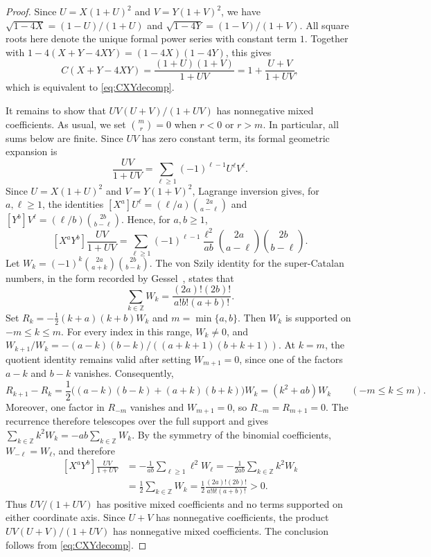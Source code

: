 \documentclass[11pt]{article}
\theoremstyle{plain}
\theoremstyle{remark}
\begin{document}
\begin{proof}
Since $U=X(1+U)^2$ and $V=Y(1+V)^2$, we have
$\sqrt{1-4X}=(1-U)/(1+U)$ and
$\sqrt{1-4Y}=(1-V)/(1+V)$.  All square roots here denote the unique
formal power series with constant term $1$.  Together with
$1-4(X+Y-4XY)=(1-4X)(1-4Y)$, this gives
\[
C(X+Y-4XY)=\frac{(1+U)(1+V)}{1+UV}
=1+\frac{U+V}{1+UV},
\]
which is equivalent to \eqref{eq:CXYdecomp}.

It remains to show that $UV(U+V)/(1+UV)$ has nonnegative mixed
coefficients.  As usual, we set $\binom{m}{r}=0$ when $r<0$ or $r>m$.
In particular, all sums below are finite.  Since $UV$ has zero
constant term, its
formal geometric expansion is
\[
\frac{UV}{1+UV}=\sum_{\ell\ge1}(-1)^{\ell-1}U^\ell V^\ell.
\]
Since $U=X(1+U)^2$ and $V=Y(1+V)^2$, Lagrange inversion gives,
for $a,\ell\ge1$, the identities
$[X^a]U^\ell=(\ell/a)\binom{2a}{a-\ell}$ and
$[Y^b]V^\ell=(\ell/b)\binom{2b}{b-\ell}$.  Hence, for $a,b\ge1$,
\[
[X^aY^b]\frac{UV}{1+UV}
=\sum_{\ell\ge1}(-1)^{\ell-1}\frac{\ell^2}{ab}
\binom{2a}{a-\ell}\binom{2b}{b-\ell}.
\]
Let
$W_k=(-1)^k\binom{2a}{a+k}\binom{2b}{b-k}$.  The von Szily identity
for the super-Catalan numbers, in the form recorded by
Gessel~\cite[Section~6]{GesselSuperBallot}, states that
\[
\sum_{k\in\mathbb Z}W_k
=\frac{(2a)!(2b)!}{a!b!(a+b)!}.
\]
Set $R_k=-\tfrac12(k+a)(k+b)W_k$ and
$m=\min\{a,b\}$.  Then $W_k$ is supported on $-m\le k\le m$.
For every index in this range, $W_k\ne0$, and
$W_{k+1}/W_k=-(a-k)(b-k)/((a+k+1)(b+k+1))$.
At $k=m$, the quotient identity remains valid after setting
$W_{m+1}=0$, since one of the factors $a-k$ and $b-k$ vanishes.
Consequently,
\[
R_{k+1}-R_k
=\frac12\bigl((a-k)(b-k)+(a+k)(b+k)\bigr)W_k
=(k^2+ab)W_k
\qquad(-m\le k\le m).
\]
Moreover, one factor in $R_{-m}$ vanishes and $W_{m+1}=0$, so
$R_{-m}=R_{m+1}=0$.  The recurrence therefore telescopes over the
full support and gives
$\sum_{k\in\mathbb Z}k^2W_k=-ab\sum_{k\in\mathbb Z}W_k$.
By the symmetry of the binomial
coefficients, $W_{-\ell}=W_\ell$, and therefore
\[
\begin{aligned}
[X^aY^b]\frac{UV}{1+UV}
&=-\frac1{ab}\sum_{\ell\ge1}\ell^2W_\ell
=-\frac1{2ab}\sum_{k\in\mathbb Z}k^2W_k\\
&=\frac12\sum_{k\in\mathbb Z}W_k
=\frac12\frac{(2a)!(2b)!}{a!b!(a+b)!}>0.
\end{aligned}
\]
Thus $UV/(1+UV)$ has positive mixed coefficients and no terms supported
on either coordinate axis.  Since $U+V$ has nonnegative coefficients,
the product $UV(U+V)/(1+UV)$ has nonnegative mixed coefficients.  The
conclusion follows from \eqref{eq:CXYdecomp}.
\end{proof}
\end{document}
